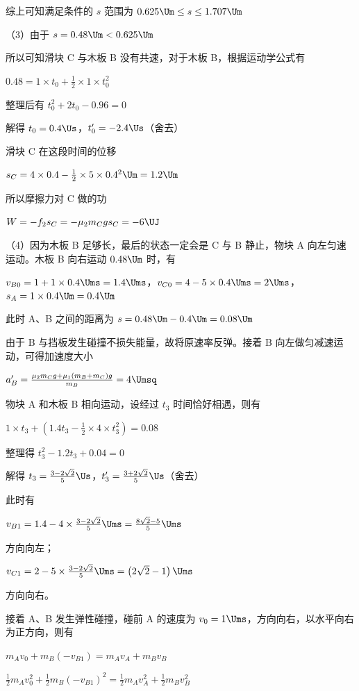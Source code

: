 \documentclass[\gkver]{gaokaozhenti}
\begin{document}
\begin{enumerate}
{综上可知满足条件的 $s$ 范围为 $0.625 \Um \leq s \leq 1.707 \Um$

（3）由于 $s = 0.48 \Um < 0.625 \Um$

所以可知滑块 C 与木板 B 没有共速，对于木板 B，根据运动学公式有

$0.48 = 1 \times t_{0} + \frac{1}{2} \times 1 \times t_{0}^{2}$

整理后有 $t_{0}^{2} + 2t_{0} - 0.96 = 0$

解得 $t_{0}=0.4 \Us$，$t_{0}'=-2.4 \Us$（舍去）

滑块 C 在这段时间的位移

$s_{C}=4\times0.4-\frac{1}{2}\times5\times0.4^{2} \Um=1.2 \Um$

所以摩擦力对 C 做的功

$W=-f_{2}s_{C}=-\mu_{2}m_{C}gs_{C}=-6 \UJ$

（4）因为木板 B 足够长，最后的状态一定会是 C 与 B 静止，物块 A 向左匀速运动。木板 B 向右运动 $0.48 \Um$ 时，有

$v_{B0}=1+1\times0.4 \Ums=1.4 \Ums$，$v_{C0}=4-5\times0.4 \Ums=2 \Ums$，$s_{A}=1\times0.4 \Um=0.4 \Um$

此时 A、B 之间的距离为 $s = 0.48 \Um - 0.4 \Um = 0.08 \Um$

由于 B 与挡板发生碰撞不损失能量，故将原速率反弹。接着 B 向左做匀减速运动，可得加速度大小

$a_{B}'=\frac{\mu_{2}m_{C}g+\mu_{1}(m_{B}+m_{C})g}{m_{B}}=4 \Umsq$

物块 A 和木板 B 相向运动，设经过 $t_{3}$ 时间恰好相遇，则有

$1\times t_{3}+\left(1.4t_{3}-\frac{1}{2}\times4\times t_{3}^{2}\right)=0.08$

整理得 $t_{3}^{2}-1.2t_{3}+0.04=0$

解得 $t_{3}=\frac{3-2\sqrt{2}}{5} \Us$，$t_{3}'=\frac{3+2\sqrt{2}}{5} \Us$（舍去）

此时有

$v_{B1}=1.4-4\times\frac{3-2\sqrt{2}}{5} \Ums=\frac{8\sqrt{2}-5}{5} \Ums$

方向向左；

$v_{C1}=2-5\times\frac{3-2\sqrt{2}}{5} \Ums=\left(2\sqrt{2}-1\right) \Ums$

方向向右。

接着 A、B 发生弹性碰撞，碰前 A 的速度为 $v_{0} = 1 \Ums$，方向向右，以水平向右为正方向，则有

$m_{A} v_{0} + m_{B} \left(-v_{B1}\right) = m_{A} v_{A} + m_{B} v_{B}$

$\frac{1}{2} m_{A} v_{0}^{2} + \frac{1}{2} m_{B} \left(-v_{B1}\right)^{2} = \frac{1}{2} m_{A} v_{A}^{2} + \frac{1}{2} m_{B} v_{B}^{2}$

}
\end{enumerate}
\end{document}
